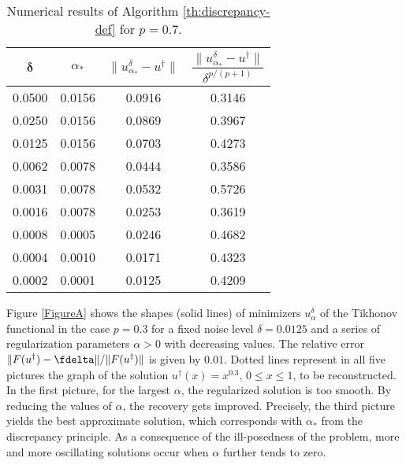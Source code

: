 \documentclass[10pt]{article}
\theoremstyle{definition}
\begin{document}
\begin{table}
\caption{Numerical results of Algorithm \ref{th:discrepancy-def} for $p=0.7$.}\label{tablep07}
\begin{center}
\begin{tabular}{@{}cccc}
\hline
$\mathbf{\delta}$  & $\alpha_{\ast}$ &$\lVert u_{\alpha_{\ast}}^{\delta}-u^{\dagger}\rVert$  & $\dfrac{\lVert u_{\alpha_{\ast}}^{\delta}-u^{\dagger}\rVert}{\delta^{p/(p+1)}}$ \\
\hline
  0.0500 & 0.0156 & 0.0916  & 0.3146 \\
  0.0250 & 0.0156 & 0.0869  & 0.3967 \\
  0.0125 & 0.0156 & 0.0703  & 0.4273 \\
  0.0062 & 0.0078 & 0.0444  & 0.3586 \\
  0.0031 & 0.0078 & 0.0532  & 0.5726 \\
  0.0016 & 0.0078 & 0.0253  & 0.3619 \\
  0.0008 & 0.0005 & 0.0246  & 0.4682 \\
  0.0004 & 0.0010 & 0.0171  & 0.4323 \\
  0.0002 & 0.0001 & 0.0125  & 0.4209 \\
\hline
\end{tabular}
\end{center}
\end{table}

Figure \ref{FigureA} shows the shapes (solid lines) of minimizers $u_{\alpha}^{\delta}$ of the Tikhonov functional in the case $p=0.3$ for a fixed noise level $\delta=0.0125$ and a series of regularization parameters $\alpha>0$ with decreasing values.
The relative error $\lVert F(u^{\dagger})-\fdelta\rVert/{\lVert F(u^{\dagger})\rVert}$ is given by $0.01$.
Dotted lines represent in all five pictures the graph of the solution $u^{\dagger}(x)=x^{0.3}, \, 0 \le x \le 1$, to be reconstructed. In the first picture, for the largest $\alpha$, the regularized solution is too smooth. By reducing the values of $\alpha$, the recovery gets
improved. Precisely, the third picture yields the best approximate solution, which corresponds with $\alpha_*$ from the discrepancy principle. As a consequence of the ill-posedness of the problem, more and more oscillating solutions occur when $\alpha$ further tends to zero.

\end{document}
